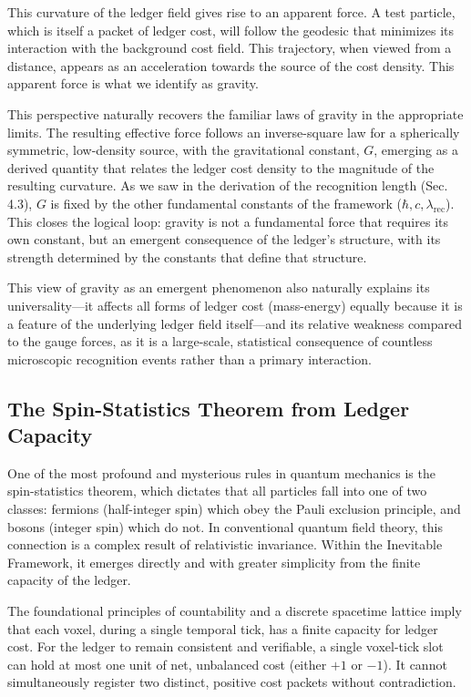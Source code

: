 \documentclass[11pt,a4paper]{article}
\begin{document}
This curvature of the ledger field gives rise to an apparent force. A test particle, which is itself a packet of ledger cost, will follow the geodesic that minimizes its interaction with the background cost field. This trajectory, when viewed from a distance, appears as an acceleration towards the source of the cost density. This apparent force is what we identify as gravity.

This perspective naturally recovers the familiar laws of gravity in the appropriate limits. The resulting effective force follows an inverse-square law for a spherically symmetric, low-density source, with the gravitational constant, \(G\), emerging as a derived quantity that relates the ledger cost density to the magnitude of the resulting curvature. As we saw in the derivation of the recognition length (Sec. 4.3), \(G\) is fixed by the other fundamental constants of the framework (\(\hbar, c, \lambda_{\text{rec}}\)). This closes the logical loop: gravity is not a fundamental force that requires its own constant, but an emergent consequence of the ledger's structure, with its strength determined by the constants that define that structure.

This view of gravity as an emergent phenomenon also naturally explains its universality—it affects all forms of ledger cost (mass-energy) equally because it is a feature of the underlying ledger field itself—and its relative weakness compared to the gauge forces, as it is a large-scale, statistical consequence of countless microscopic recognition events rather than a primary interaction.

\subsection{The Spin-Statistics Theorem from Ledger Capacity}
One of the most profound and mysterious rules in quantum mechanics is the spin-statistics theorem, which dictates that all particles fall into one of two classes: fermions (half-integer spin) which obey the Pauli exclusion principle, and bosons (integer spin) which do not. In conventional quantum field theory, this connection is a complex result of relativistic invariance. Within the Inevitable Framework, it emerges directly and with greater simplicity from the finite capacity of the ledger.

The foundational principles of countability and a discrete spacetime lattice imply that each voxel, during a single temporal tick, has a finite capacity for ledger cost. For the ledger to remain consistent and verifiable, a single voxel-tick slot can hold at most one unit of net, unbalanced cost (either \(+1\) or \(-1\)). It cannot simultaneously register two distinct, positive cost packets without contradiction.
\end{document}
